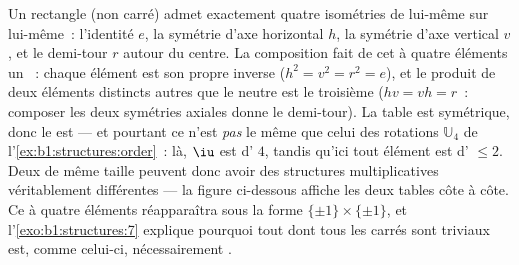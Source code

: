 \begin{example}\label{ex:b1:structures:klein}
Un rectangle (non carré) admet exactement quatre isométries de lui-même
sur lui-même~: l'identité $e$, la symétrie d'axe horizontal $h$, la
symétrie d'axe vertical $v$, et le demi-tour $r$ autour du
centre. La composition fait de cet  à quatre éléments un
~: chaque élément est son propre inverse ($h^2 = v^2 = r^2 = e$),
et le produit de deux éléments distincts autres que le neutre est le
troisième ($hv = vh = r$~: composer les deux symétries axiales donne le
demi-tour). La table est symétrique, donc le  est  --- et
pourtant ce n'est \emph{pas} le même  que celui des rotations
$\mathbb U_4$ de l'\cref{ex:b1:structures:order}~: là, $\iu$ est d'
$4$, tandis qu'ici tout élément est d' $\leq 2$. Deux  de
même taille peuvent donc avoir des structures multiplicatives
véritablement différentes --- la figure ci-dessous affiche les deux
tables côte à côte. Ce  à quatre éléments réapparaîtra sous la
forme $\{\pm1\} \times \{\pm1\}$, et
l'\cref{exo:b1:structures:7} explique pourquoi tout  dont tous les
carrés sont triviaux est, comme celui-ci, nécessairement .
\end{example}

